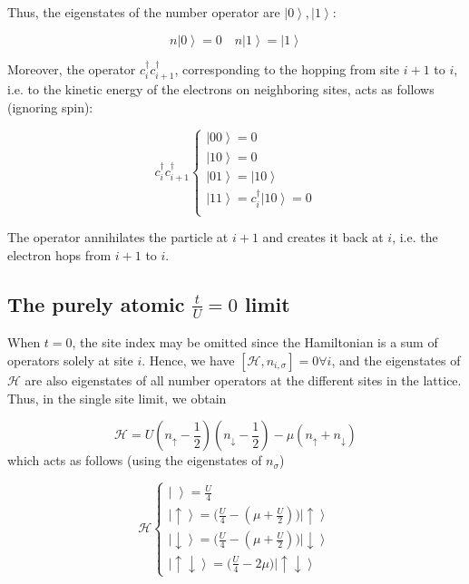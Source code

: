 Thus, the eigenstates of the number operator are $\left| 0 \right\rangle, \left| 1 \right\rangle$:

\begin{equation}
n \left| 0 \right\rangle = 0 \quad n \left| 1 \right\rangle = \left| 1 \right\rangle
\end{equation}

Moreover, the operator $c_i^\dagger c_{i+1}^\dagger$, corresponding to the hopping from site $i+1$ to $i$, i.e. to the kinetic energy of the electrons on neighboring sites, acts as follows (ignoring spin):

\begin{equation}
c_i^\dagger c_{i+1}^\dagger \begin{cases}
\left|0 0 \right\rangle = 0 \\
\left|1 0 \right\rangle =  0 \\
\left|0 1 \right\rangle =  \left| 1 0 \right\rangle \\
\left|1 1 \right\rangle =  c_i^\dagger \left| 1 0  \right\rangle = 0 \\
\end{cases}
\end{equation}

The operator annihilates the particle at $i+1$ and creates it back at $i$, i.e. the electron hops from $i+1$ to $i$.

\subsection{The purely atomic $\frac{t}{U} = 0$ limit}

When $t = 0$, the site index may be omitted since the Hamiltonian is a sum of operators solely at site $i$.
Hence, we have $[ \mathcal{H}, n_{i,\sigma} ] = 0 \forall i $, and the eigenstates of $\mathcal{H}$ are also eigenstates of all number operators at the different sites in the lattice.
Thus, in the single site limit, we obtain

\begin{equation}
\mathcal{H} = U (n_\uparrow - \frac{1}{2} ) (n_\downarrow - \frac{1}{2} ) - \mu ( n_\uparrow + n_\downarrow )
\end{equation}
which acts as follows (using the eigenstates of $n_\sigma$)

\begin{equation}
\mathcal{H} \begin{cases}
\left| \,\, \right\rangle = \frac{U}{4} \\
\left| \uparrow \right\rangle = \bigg( \frac{U}{4} - (\mu + \frac{U}{2} ) \bigg) \left| \uparrow \right\rangle \\
\left| \downarrow \right\rangle = \bigg( \frac{U}{4} - (\mu + \frac{U}{2} ) \bigg) \left| \downarrow \right\rangle \\
\left| \uparrow \downarrow \right\rangle = \bigg( \frac{U}{4} - 2 \mu \bigg) \left| \uparrow \downarrow \right\rangle
\end{cases}
\end{equation}

